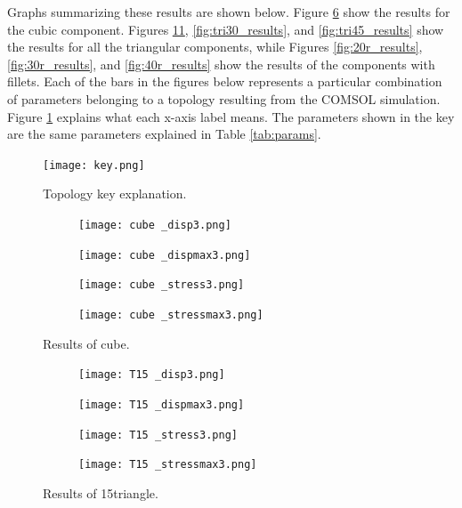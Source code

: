 \documentclass[../main.tex]{subfiles}
\begin{document}
Graphs summarizing these results are shown below. Figure \ref{fig:cuberesults} show the results for the cubic component. Figures \ref{fig:tri15_results}, \ref{fig:tri30_results}, and \ref{fig:tri45_results} show the results for all the triangular components, while Figures \ref{fig:20r_results}, \ref{fig:30r_results}, and \ref{fig:40r_results} show the results of the components with fillets. Each of the bars in the figures below represents a particular combination of parameters belonging to a topology resulting from the COMSOL simulation. Figure \ref{fig:key} explains what each x-axis label means. The parameters shown in the key are the same parameters explained in Table \ref{tab:params}.

\begin{figure}[h!]
  \centering
  \texttt{[image: key.png]}
  \caption{Topology key explanation.}
  \label{fig:key}
  \end{figure}

\begin{figure}[h!]
  \centering 
  \begin{subfigure}[b]{0.45\textwidth}
    \centering 
    \texttt{[image: cube \_disp3.png]}
    \label{}
  \end{subfigure}
  \begin{subfigure}[b]{0.45\textwidth}
    \centering 
    \texttt{[image: cube \_dispmax3.png]}
    \label{}
  \end{subfigure}
  \begin{subfigure}[b]{0.45\textwidth}
    \centering 
    \texttt{[image: cube \_stress3.png]}
    \label{}
  \end{subfigure}
  \begin{subfigure}[b]{0.45\textwidth}
    \centering 
    \texttt{[image: cube \_stressmax3.png]}
    \label{}
  \end{subfigure}
  \caption{Results of cube.}
  \label{fig:cuberesults}
\end{figure}

\begin{figure}[h!]
  \centering 
  \begin{subfigure}[b]{0.45\textwidth}
    \centering 
    \texttt{[image: T15 \_disp3.png]}
    \label{}
  \end{subfigure}
  \begin{subfigure}[b]{0.45\textwidth}
    \centering 
    \texttt{[image: T15 \_dispmax3.png]}
    \label{}
  \end{subfigure}
  \begin{subfigure}[b]{0.45\textwidth}
    \centering 
    \texttt{[image: T15 \_stress3.png]}
    \label{}
  \end{subfigure}
  \begin{subfigure}[b]{0.45\textwidth}
    \centering 
    \texttt{[image: T15 \_stressmax3.png]}
    \label{}
  \end{subfigure}
  \caption{Results of 15\degree triangle.}
  \label{fig:tri15_results}
\end{figure}
\end{document}
